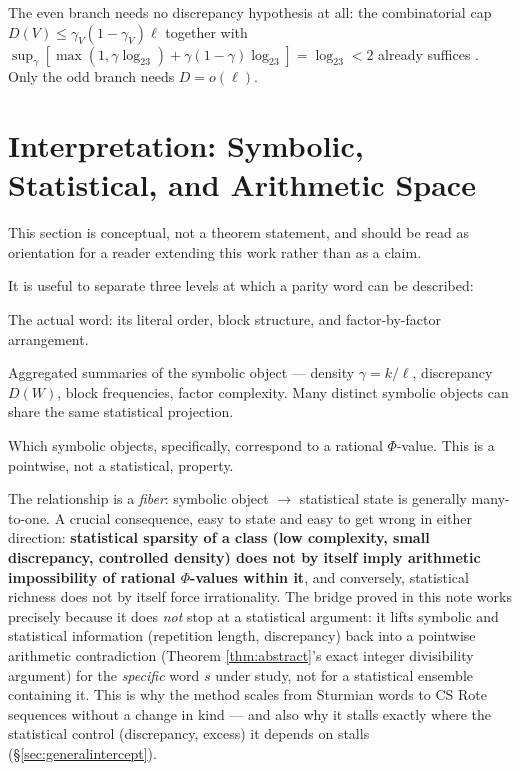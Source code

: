 \documentclass[11pt]{article}
\begin{document}
The even branch needs no discrepancy hypothesis at all: the combinatorial cap
$D(V)\le\gamma_V(1-\gamma_V)\ell$ together with
$\sup_\gamma[\max(1,\gamma\log_23)+\gamma(1-\gamma)\log_23]=\log_23<2$ already suffices
\cite{Phase1Repetition}. Only the odd branch needs $D=o(\ell)$.

\section{Interpretation: Symbolic, Statistical, and Arithmetic Space}
\label{sec:interpretation}

This section is conceptual, not a theorem statement, and should be read as orientation for a reader extending this work rather than as a claim.

It is useful to separate three levels at which a parity word can be described:

\begin{description}[leftmargin=2em]
\item[Symbolic space.] The actual word: its literal order, block structure, and factor-by-factor arrangement.
\item[Statistical projection.] Aggregated summaries of the symbolic object --- density $\gamma=k/\ell$, discrepancy $D(W)$, block frequencies, factor complexity. Many distinct symbolic objects can share the same statistical projection.
\item[Arithmetic admissibility.] Which symbolic objects, specifically, correspond to a rational $\Phi$-value. This is a pointwise, not a statistical, property.
\end{description}

The relationship is a \emph{fiber}: symbolic object $\to$ statistical state is generally many-to-one. A crucial consequence, easy to state and easy to get wrong in either direction: \textbf{statistical sparsity of a class (low complexity, small discrepancy, controlled density) does not by itself imply arithmetic impossibility of rational $\Phi$-values within it}, and conversely, statistical richness does not by itself force irrationality. The bridge proved in this note works precisely because it does \emph{not} stop at a statistical argument: it lifts symbolic and statistical information (repetition length, discrepancy) back into a pointwise arithmetic contradiction (Theorem \ref{thm:abstract}'s exact integer divisibility argument) for the \emph{specific} word $s$ under study, not for a statistical ensemble containing it. This is why the method scales from Sturmian words to CS Rote sequences without a change in kind --- and also why it stalls exactly where the statistical control (discrepancy, excess) it depends on stalls (\S\ref{sec:generalintercept}).
\end{document}
